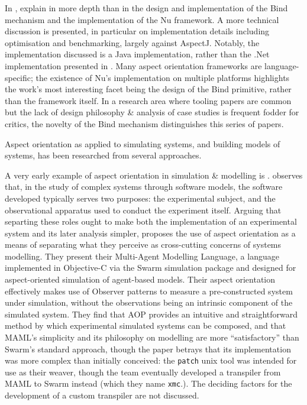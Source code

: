 In \cite{dyerNUmasters}, \citeauthor{dyerNUmasters} explain in more depth than
in \cite{rajan2006nu} the design and implementation of the Bind mechanism and
the implementation of the Nu framework. A more technical discussion is
presented, in particular on implementation details including optimisation and
benchmarking, largely against AspectJ. Notably, the implementation discussed is
a Java implementation, rather than the .Net implementation presented in
\cite{rajan2006nu}. Many aspect orientation frameworks are language-specific;
the existence of Nu's implementation on multiple platforms highlights the work's
most interesting facet being the design of the Bind primitive, rather than the
framework itself. In a research area where tooling papers are common but the
lack of design philosophy \& analysis of case studies is frequent fodder for
critics, the novelty of the Bind mechanism distinguishes this series of papers.



Aspect orientation as applied to simulating systems, and building models of
systems, has been researched from several approaches.

A very early example of aspect orientation in simulation \& modelling is
\cite{gulyas1999use}. \citeauthor{gulyas1999use} observes that, in the study of
complex systems through software models, the software developed typically serves
two purposes: the experimental subject, and the observational apparatus used to
conduct the experiment itself. Arguing that separting these roles ought to make
both the implementation of an experimental system and its later analysis
simpler, \citeauthor{gulyas1999use} proposes the use of aspect orientation as a
means of separating what they perceive as cross-cutting concerns of systems
modelling. They present their Multi-Agent Modelling Language, a language
implemented in Objective-C via the Swarm simulation package and designed for
aspect-oriented simulation of agent-based models. Their aspect orientation
effectively makes use of Observer patterns to measure a pre-constructed system
under simulation, without the observations being an intrinsic component of the
simulated system. They find that AOP provides an intuitive and straightforward
method by which experimental simulated systems can be composed, and that MAML's
simplicity and its philosophy on modelling are more ``satisfactory'' than
Swarm's standard approach, though the paper betrays that its implementation was
more complex than initially conceived: the \lstinline{patch} unix tool was
intended for use as their weaver, though the team eventually developed a
transpiler from MAML to Swarm instead (which they name \lstinline{xmc}.). The
deciding factors for the development of a custom transpiler are not discussed.

